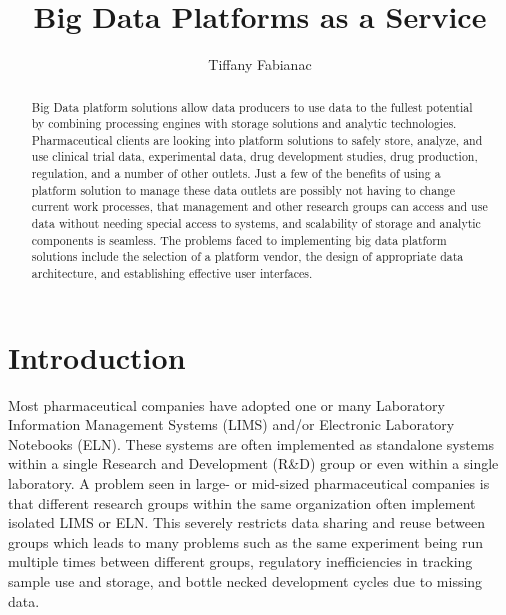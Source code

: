 \documentclass[sigconf]{acmart}
\begin{document}
\title{Big Data Platforms as a Service}


\author{Tiffany Fabianac}
\orcid{}

\renewcommand{\shortauthors}{T. Fabianac}


\begin{abstract}
Big Data platform solutions allow data producers to use data to the fullest potential by combining processing engines with storage solutions and analytic technologies. Pharmaceutical clients are looking into platform solutions to safely store, analyze, and use clinical trial data, experimental data, drug development studies, drug production, regulation, and a number of other outlets. Just a few of the benefits of using a platform solution to manage these data outlets are possibly not having to change current work processes, that management and other research groups can access and use data without needing special access to systems, and scalability of storage and analytic components is seamless. The problems faced to implementing big data platform solutions include the selection of a platform vendor, the design of appropriate data architecture, and establishing effective user interfaces.
\end{abstract}



\maketitle


\section{Introduction}
Most pharmaceutical companies have adopted one or many Laboratory Information Management Systems (LIMS) and/or Electronic Laboratory Notebooks (ELN). These systems are often implemented as standalone systems within a single Research and Development (R\&D) group or even within a single laboratory. A problem seen in large- or mid-sized pharmaceutical companies is that different research groups within the same organization often implement isolated LIMS or ELN. This severely restricts data sharing and reuse between groups which leads to many problems such as the same experiment being run multiple times between different groups, regulatory inefficiencies in tracking sample use and storage, and bottle necked development cycles due to missing data.
\end{document}
